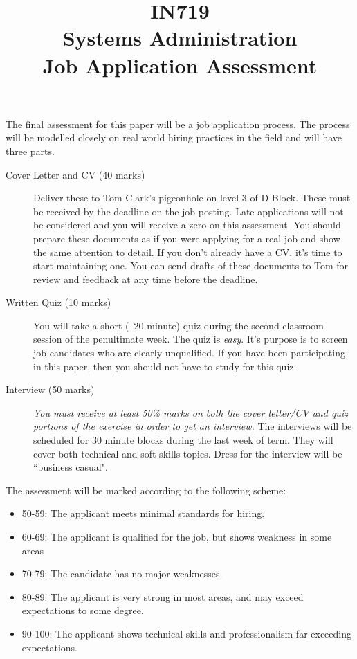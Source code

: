 \documentclass{article}   	%
\title{IN719\\Systems Administration\\Job Application Assessment}
\date{}
\begin{document}
\maketitle
The final assessment for this paper will be a job application process.  The process will be modelled closely on real world hiring practices in the field and will have three parts.


\begin{description}
\item[Cover Letter and CV (40 marks)] Deliver these to Tom Clark's pigeonhole on level 3 of D Block.  These must be received by the deadline on the job posting.  Late applications will not be considered and you will receive a zero on this assessment.  You should prepare these documents as if you were applying for a real job and show the same attention to detail.  If you don't already have a CV, it's time to start maintaining one.  You can send drafts of these documents to Tom for review and feedback at any time before the deadline.

\item[Written Quiz (10 marks)] You will take a short (~20 minute) quiz during the second classroom session of the penultimate week.  The quiz is \emph{easy}.  It's purpose is to screen job candidates who are clearly unqualified.  If you have been participating in this paper, then you should not have to study for this quiz.

\item[Interview (50 marks)] \emph{You must receive at least 50\% marks on both the cover letter/CV and quiz portions of the exercise in order to get an interview.} The interviews will be scheduled for 30 minute blocks during the last week of term.  They will cover both technical and soft skills topics.  Dress for the interview will be ``business casual".  

\end{description}

The assessment will be marked according to the following scheme:
\begin{itemize}
\item 50-59:  The applicant meets minimal standards for hiring.  
\item 60-69:  The applicant is qualified for the job, but shows weakness in some areas
\item 70-79:  The candidate has no major weaknesses. 
\item 80-89:  The applicant is very strong in most areas, and may exceed expectations to some degree. 
\item 90-100: The applicant shows technical skills and professionalism far exceeding expectations.  
\end{itemize}
\end{document}
